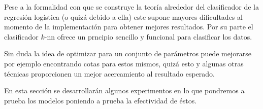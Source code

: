 \documentclass[11pt,letterpaper, reqno]{article}
\begin{document}
Pese a la formalidad con que se construye la teoría alrededor del clasificador de la regresión logística (o quizá debido a ella) este supone mayores dificultades al momento de la implementación para obtener mejores resultados. Por su parte el clasificador $k$-nn ofrece un prncipio sencillo y funcional para clasificar los datos.

Sin duda la idea de optimizar para un conjunto de parámetros puede mejorarse por ejemplo encontrando cotas para estos mismos, quizá esto y algunas otras técnicas proporcionen un mejor acercamiento al resultado esperado.

En esta sección se desarrollarán algunos experimentos en lo que pondremos a prueba los modelos poniendo a prueba la efectividad de éstos.
\end{document}
